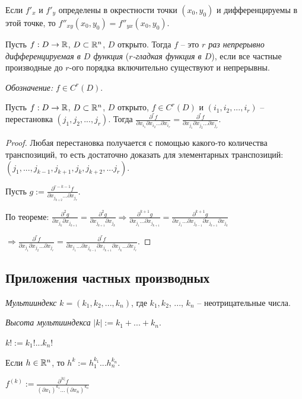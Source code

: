 \begin{exercise}
    Если $f'_x$ и $f'_y$ определены в окрестности точки $(x_0, y_0)$ и дифференцируемы в этой точке, то $f''_{xy}(x_0, y_0)=f''_{yx}(x_0, y_0)$.
\end{exercise}

\begin{definition}
    Пусть $f:D\rightarrow \mathbb{R}$, $D\subset \mathbb{R}^n$, $D$ открыто. Тогда $f$ – это \textit{$r$ раз непрерывно дифференцируемая в $D$ функция} (\textit{$r$-гладкая функция в $D$}),  если все частные производные до $r$-ого порядка включительно существуют и непрерывны.

    \textit{Обозначение:} $f\in C^r(D)$.
\end{definition}

\begin{theorem}
    Пусть $f:D\rightarrow \mathbb{R}$, $D\subset \mathbb{R}^n$, $D$ открыто, $f\in C^r(D)$ и $(i_1, i_2, ..., i_r)$ – перестановка $(j_1, j_2, ..., j_r)$. Тогда $\frac{\partial^r f}{\partial x_{i_1} \partial x_{i_2} ... \partial x_{i_r}}=\frac{\partial^r f}{\partial x_{j_1} \partial x_{j_2} ... \partial x_{j_r}}$.
\end{theorem}

\begin{proof}
    Любая перестановка получается с помощью какого-то количества транспозиций, то есть достаточно доказать для элементарных транспозиций: $(j_1, ..., j_{k-1}, j_{k+1}, j_k, j_{k+2}, ... j_r)$.

    Пусть $g:=\frac{\partial^{r-k-1} f}{\partial x_{j_{k+2}}... \partial x_{j_r}}$. 
    
    По теореме: $\frac{\partial^2 g}{\partial x_{j_k}\partial x_{j_{k+1}}}=\frac{\partial^2 g}{\partial x_{j_{k+1}}\partial x_{j_{k}}}\Rightarrow \frac{\partial^{k+1} g}{\partial x_{j_{1}}...\partial x_{j_{k+1}}}=\frac{\partial^{k+1} g}{\partial x_{j_{1}}...\partial x_{j_{k-1}}\partial x_{j_{k+1}}\partial x_{j_{k}}}$
    
    $\Rightarrow \frac{\partial^r f}{\partial x_{j_1} \partial x_{j_2} ... \partial x_{j_r}}=\frac{\partial^r f}{\partial x_{j_1} ...\partial x_{j_{k-1}}\partial x_{j_{k+1}}\partial x_{j_k} ... \partial x_{j_r}}$.
\end{proof}

\subsection*{Приложения частных производных}
\begin{definition}
    \textit{Мультииндекс} $k=(k_1, k_2, ..., k_n)$, где $k_1, k_2$, ..., $k_n$ – неотрицательные числа.

    \textit{Высота мультииндекса} $|k|:=k_1+...+k_n$.

    $k!:=k_1!...k_n!$

    Если $h\in \mathbb{R}^n$, то $h^k:=h_1^{k_1}...h_n^{k_n}$.

    $f^{(k)}:=\frac{\partial^{|k|}f}{(\partial x_1)^{k_1}...(\partial x_n)^{k_n}}$
\end{definition}

